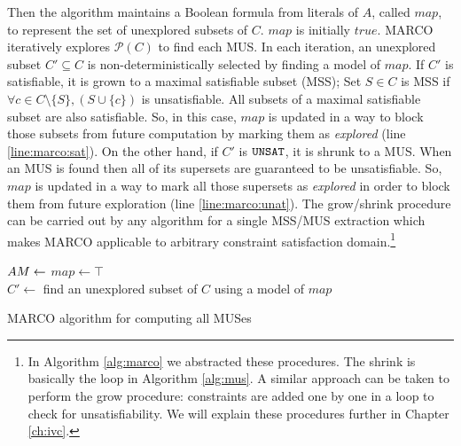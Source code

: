 Then the algorithm maintains a Boolean formula from literals of $A$, called $map$, to represent the set
of unexplored subsets of $C$.  $map$ is initially $true$.
MARCO iteratively explores $\mathcal{P} (C)$ to find each MUS. In each iteration, an unexplored subset $C' \subseteq C$ is non-deterministically selected by finding
a model of $map$. If $C'$ is satisfiable, it is grown
to a maximal satisfiable subset (MSS); Set $S \in C$ is MSS if $\forall c \in C \setminus \{S\}, (S \cup \{c\})$ is unsatisfiable. All subsets of a maximal satisfiable subset are also satisfiable. So, in this case, $map$ is updated in a way to block those subsets from future computation by marking them as \emph{explored} (line \ref{line:marco:sat}).
On the other hand, if $C'$ is $\texttt{UNSAT}$, it is shrunk to a MUS. 
When an MUS is found then all of its supersets are guaranteed to be unsatisfiable. So, $map$ is updated in a way 
to mark all those supersets as \emph{explored} in order to block them from future exploration (line \ref{line:marco:unat}).
The grow/shrink procedure can be carried out by any algorithm for
a single MSS/MUS extraction which makes MARCO applicable to arbitrary
constraint satisfaction domain.\footnote{In Algorithm \ref{alg:marco} we abstracted these procedures. The shrink is basically the loop in Algorithm \ref{alg:mus}. A similar approach can be taken to perform the grow procedure: constraints are added one by one in a loop to check for unsatisfiability. We will explain these procedures further in Chapter \ref{ch:ivc}.}

\begin{algorithm}[t]
  \BlankLine
  $AM \leftarrow \empty$
  $map \leftarrow \top$ \\
     {
   $C' \leftarrow$ find an unexplored subset of $C$ using a model of $map$
  }
\caption{MARCO algorithm for computing all MUSes}
\label{alg:marco}
\end{algorithm}


